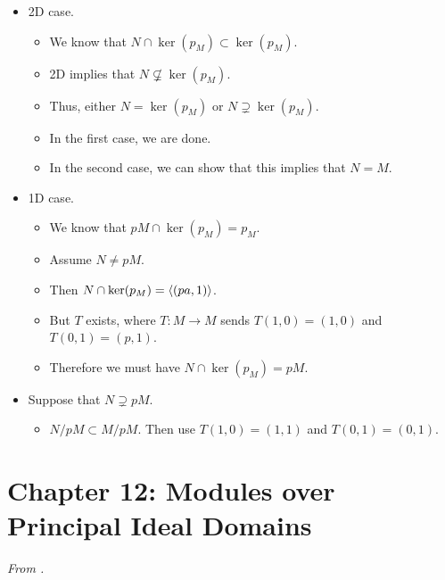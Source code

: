 \documentclass[../notes.tex]{subfiles}
\begin{document}
\begin{itemize}
\begin{itemize}
        \item 2D case.
        \begin{itemize}
            \item We know that $N\cap\ker(p_M)\subset\ker(p_M)$.
            \item 2D implies that $N\not\subsetneq\ker(p_M)$.
            \item Thus, either $N=\ker(p_M)$ or $N\supsetneq\ker(p_M)$.
            \item In the first case, we are done.
            \item In the second case, we can show that this implies that $N=M$.
        \end{itemize}
        \item 1D case.
        \begin{itemize}
            \item We know that $pM\cap\ker(p_M)=p_M$.
            \item Assume $N\neq pM$.
            \item Then $N\cap\ker(p_M)=\left\langle{(pa,1)}\right\rangle$.
            \item But $T$ exists, where $T:M\to M$ sends $T(1,0)=(1,0)$ and $T(0,1)=(p,1)$.
            \item Therefore we must have $N\cap\ker(p_M)=pM$.
        \end{itemize}
        \item Suppose that $N\supsetneq pM$.
        \begin{itemize}
            \item $N/pM\subset M/pM$. Then use $T(1,0)=(1,1)$ and $T(0,1)=(0,1)$.
        \end{itemize}
    \end{itemize}
\end{itemize}



\section{Chapter 12: Modules over Principal Ideal Domains}
\emph{From \textcite{bib:DummitFoote}.}
\setcounter{bookch}{12}
\setcounter{proposition}{11}
\end{document}
